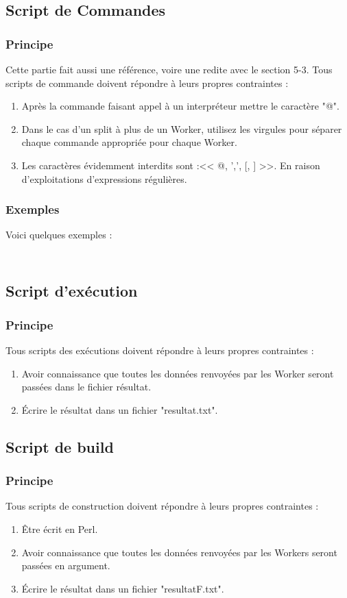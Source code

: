 \documentclass[11pt]{article}
\begin{document}
\subsection{Script de Commandes}
\subsubsection{Principe}
Cette partie fait aussi une référence, voire une redite avec le section 5-3. Tous scripts de commande doivent répondre à leurs propres contraintes :
\begin{enumerate}
\item Après la commande faisant appel à un interpréteur mettre le caractère "@".
\item Dans le cas d'un split à plus de un Worker, utilisez les virgules pour séparer chaque commande appropriée pour chaque Worker.
\item Les caractères évidemment interdits sont :<< @, ',', [, ] >>. En raison d'exploitations d'expressions régulières.
\end{enumerate}
\subsubsection{Exemples}
Voici quelques exemples :
\inputminted{perl}{../Echantillon_Script_Cmd/nQuenn14.dc}
\inputminted{perl}{../Echantillon_Script_Cmd/Toto.dc}

\subsection{Script d'exécution}
\subsubsection{Principe}
Tous scripts des exécutions doivent répondre à leurs propres contraintes :
\begin{enumerate}
\item Avoir connaissance que toutes les données renvoyées par les Worker seront passées dans le fichier résultat.
\item Écrire le résultat dans un fichier "resultat.txt".
\end{enumerate}


\subsection{Script de build}
\subsubsection{Principe}
Tous scripts de construction doivent répondre à leurs propres contraintes :
\begin{enumerate}
\item Être écrit en Perl.
\item Avoir connaissance que toutes les données renvoyées par les Workers seront passées en argument.
\item Écrire le résultat dans un fichier "resultatF.txt".
\end{enumerate}
\end{document}
